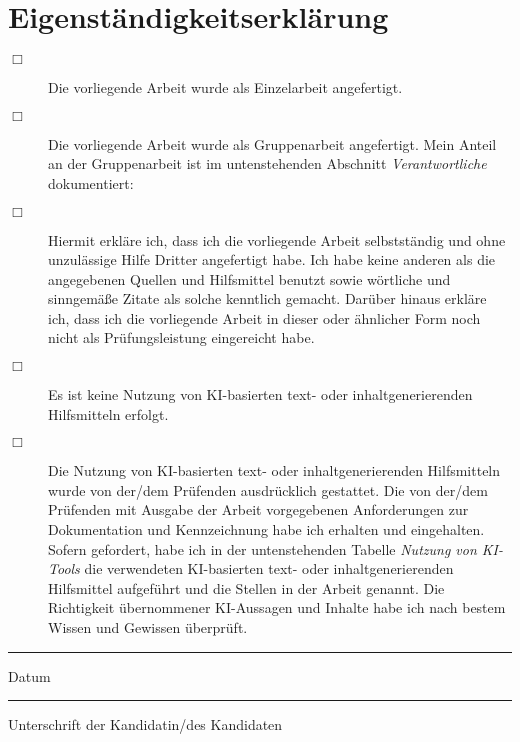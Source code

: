 \chapter{Eigenständigkeitserklärung}


\begin{small}

\begin{description}
\item[$\Box$] Die vorliegende Arbeit wurde als Einzelarbeit angefertigt.\\

\item[$\Box$] Die vorliegende Arbeit wurde als Gruppenarbeit angefertigt. Mein Anteil an der Gruppenarbeit ist im untenstehenden Abschnitt \emph{Verantwortliche} dokumentiert:\\

\vspace{1cm}

\item[$\Box$] Hiermit erkläre ich, dass ich die vorliegende Arbeit selbstständig und ohne unzulässige Hilfe Dritter angefertigt habe. Ich habe keine anderen als die angegebenen Quellen und Hilfsmittel benutzt sowie wörtliche und sinngemäße Zitate als solche kenntlich gemacht. Darüber hinaus erkläre ich, dass ich die vorliegende Arbeit in dieser oder ähnlicher Form noch nicht als Prüfungsleistung eingereicht habe.\\

\vspace{1cm}

\item[$\Box$] Es ist keine Nutzung von KI-basierten text- oder inhaltgenerierenden Hilfsmitteln erfolgt.\\

\item[$\Box$] Die Nutzung von KI-basierten text- oder inhaltgenerierenden Hilfsmitteln wurde von der/dem Prüfenden ausdrücklich gestattet. Die von der/dem Prüfenden mit Ausgabe der Arbeit vorgegebenen Anforderungen zur Dokumentation und Kennzeichnung habe ich erhalten und eingehalten. Sofern gefordert, habe ich in der untenstehenden Tabelle \emph{Nutzung von KI-Tools} die verwendeten KI-basierten text- oder inhaltgenerierenden Hilfsmittel aufgeführt und die Stellen in der Arbeit genannt. Die Richtigkeit übernommener KI-Aussagen und Inhalte habe ich nach bestem Wissen und Gewissen überprüft.\\
\end{description}

\vspace{4cm}
\begin{minipage}[t]{3cm}
	\rule{3cm}{0.5pt}
	Datum
\end{minipage}
\hfill
\begin{minipage}[t]{9cm}
	\rule{9cm}{0.5pt}
	Unterschrift der Kandidatin/des Kandidaten
\end{minipage}

\end{small}

